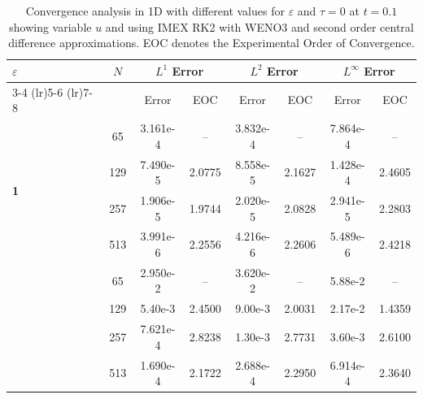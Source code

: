 \documentclass[final,11pt]{siamart251216}
\numberwithin{equation}{section}
\theoremstyle{definition}
\theoremstyle{remark}
\begin{document}
\begin{table}[htbp]
    \centering
    \small
    \begin{tabular}{@{} l c cc cc cc @{}}
        \toprule
        \multirow{2}{*}{\textbf{$\varepsilon$}} & \multirow{2}{*}{$N$} & \multicolumn{2}{c}{\textbf{$L^1$ Error}} & \multicolumn{2}{c}{\textbf{$L^2$ Error}} & \multicolumn{2}{c}{\textbf{$L^\infty$ Error}} \\
        \cmidrule(lr){3-4} \cmidrule(lr){5-6} \cmidrule(lr){7-8}
        & & Error & EOC & Error & EOC & Error & EOC \\
        \midrule
        \multirow{4}{*}{\textbf{1}} 
		& 65  & 3.161e-4 & -- & 3.832e-4 & -- & 7.864e-4 & -- \\
       & 129  & 7.490e-5 & 2.0775 & 8.558e-5 & 2.1627 & 1.428e-4 & 2.4605 \\
        & 257  & 1.906e-5 & 1.9744 & 2.020e-5 & 2.0828 & 2.941e-5 & 2.2803 \\
        & 513  & 3.991e-6 & 2.2556 & 4.216e-6 & 2.2606 & 5.489e-6 & 2.4218 \\
        
        \addlinespace[0.3cm]
        \multirow{4}{*}{\textbf{0.01}} 
		& 65  & 2.950e-2 & -- & 3.620e-2 & -- & 5.88e-2 & -- \\
       & 129  & 5.40e-3 & 2.4500 & 9.00e-3 & 2.0031 & 2.17e-2 & 1.4359 \\
        & 257  & 7.621e-4 & 2.8238 & 1.30e-3 & 2.7731 & 3.60e-3 & 2.6100 \\
        & 513  & 1.690e-4 & 2.1722 & 2.688e-4 & 2.2950 & 6.914e-4 & 2.3640 \\
        
        
        \bottomrule
    \end{tabular}
    \caption{Convergence analysis in 1D with different values for $\varepsilon$ and $\tau = 0$ at $t = 0.1$ showing variable $u$ and using IMEX RK2 with WENO3 and second order central difference approximations. EOC denotes the Experimental Order of Convergence.}
    \label{tab:convergence_1Dutau0}
\end{table}
\end{document}
